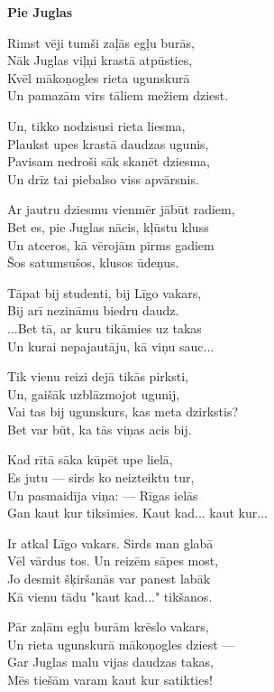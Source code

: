 \documentclass[11pt]{article}
\begin{document}
{\newpage

{\bf Pie Juglas}

Rimst vēji tumši zaļās egļu burās,\\
Nāk Juglas viļņi krastā atpūsties,\\
Kvēl mākoņogles rieta ugunskurā\\
Un pamazām virs tāliem mežiem dziest.

Un, tikko nodzisusi rieta liesma,\\
Plaukst upes krastā daudzas ugunis,\\
Pavisam nedroši sāk skanēt dziesma,\\
Un drīz tai piebalso viss apvārsnis.

Ar jautru dziesmu vienmēr jābūt radiem,\\
Bet es, pie Juglas nācis, kļūstu kluss\\
Un atceros, kā vērojām pirms gadiem\\
Šos satumsušos, klusos ūdeņus.

Tāpat bij studenti, bij Līgo vakars,\\
Bij arī nezināmu biedru daudz.\\
...Bet tā, ar kuru tikāmies uz takas\\
Un kurai nepajautāju, kā viņu sauc...

Tik vienu reizi dejā tikās pirksti,\\
Un, gaišāk uzblāzmojot ugunij,\\
Vai tas bij ugunskurs, kas meta dzirkstis?\\
Bet var būt, ka tās viņas acis bij.

Kad rītā sāka kūpēt upe lielā,\\
Es jutu --- sirds ko neizteiktu tur,\\
Un pasmaidīja viņa: --- Rīgas ielās\\
Gan kaut kur tiksimies. Kaut kad... kaut kur...

Ir atkal Līgo vakars. Sirds man glabā\\
Vēl vārdus tos. Un reizēm sāpes most,\\
Jo desmit šķiršanās var panest labāk\\
Kā vienu tādu "kaut kad..." tikšanos.

Pār zaļām egļu burām krēslo vakars,\\
Un rieta ugunskurā mākoņogles dziest ---\\
Gar Juglas malu vijas daudzas takas,\\
Mēs tiešām varam kaut kur satikties!


}
\end{document}
